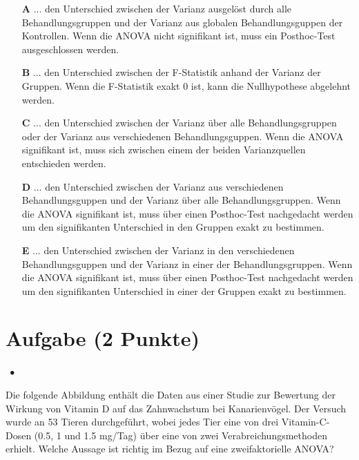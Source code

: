 \documentclass[a4paper, 9pt]{scrartcl}\usepackage[]{graphicx}\usepackage[]{xcolor}
\begin{document}
\begin{enumerate}
\item [\textbf{A} \msquare] ... den Unterschied zwischen der Varianz ausgelöst durch alle Behandlungsgruppen und der Varianz aus globalen Behandlungsguppen der Kontrollen. Wenn die ANOVA nicht signifikant ist, muss ein Posthoc-Test ausgeschlossen werden.
\item [\textbf{B} \msquare] ... den Unterschied zwischen der F-Statistik anhand der Varianz der Gruppen. Wenn die F-Statistik exakt 0 ist, kann die Nullhypothese abgelehnt werden.
\item [\textbf{C} \msquare] ... den Unterschied zwischen der Varianz über alle Behandlungsgruppen oder der Varianz aus verschiedenen Behandlungsguppen. Wenn die ANOVA signifikant ist, muss sich zwischen einem der beiden Varianzquellen entschieden werden.
\item [\textbf{D} \msquare] ... den Unterschied zwischen der Varianz aus verschiedenen Behandlungsguppen und der Varianz über alle Behandlungsgruppen. Wenn die ANOVA signifikant ist, muss über einen Posthoc-Test nachgedacht werden um den signifikanten Unterschied in den Gruppen exakt zu bestimmen.
\item [\textbf{E} \msquare] ... den Unterschied zwischen der Varianz in den verschiedenen Behandlungsguppen und der Varianz in einer der Behandlungsgruppen. Wenn die ANOVA signifikant ist, muss über einen Posthoc-Test nachgedacht werden um den signifikanten Unterschied in einer der Gruppen exakt zu bestimmen.
\end{enumerate}

\section{Aufgabe \hfill (2 Punkte)}

\ifcollection
\begin{flushright}
\tiny\vspace{-2Ex}
\textbf{\examinhaltstart}
\exammodulestatversuch $\;\bullet$
\exammodulebiostat
\vspace{-1Ex}
\end{flushright}
\fi




Die folgende Abbildung enthält die Daten aus einer Studie zur Bewertung der Wirkung von Vitamin D auf das Zahnwachstum bei Kanarienvögel. Der Versuch wurde an 53 Tieren durchgeführt, wobei jedes Tier eine von  drei Vitamin-C-Dosen (0.5, 1 und 1.5 mg/Tag) über eine von zwei Verabreichungsmethoden erhielt. Welche Aussage ist richtig im Bezug auf eine zweifaktorielle ANOVA?
\end{document}
